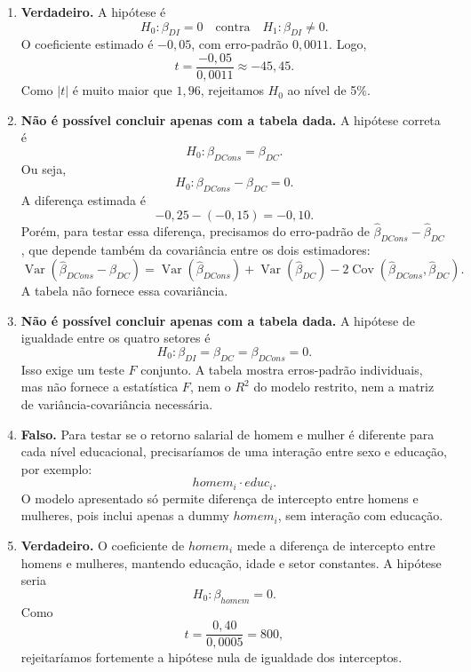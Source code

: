 \documentclass[12pt,letterpaper,onecolumn]{exam}
\begin{document}
\begin{questions}
\begin{enumerate}[label=(\arabic*)]
    \item \textbf{Verdadeiro.} A hipótese é
    \[
    H_0:\beta_{DI}=0
    \quad\text{contra}\quad
    H_1:\beta_{DI}\neq 0.
    \]
    O coeficiente estimado é \(-0{,}05\), com erro-padrão \(0{,}0011\). Logo,
    \[
    t=\frac{-0{,}05}{0{,}0011}\approx -45{,}45.
    \]
    Como \(|t|\) é muito maior que \(1{,}96\), rejeitamos \(H_0\) ao nível de 5\%.

    \item \textbf{Não é possível concluir apenas com a tabela dada.} A hipótese correta é
    \[
    H_0:\beta_{DCons}=\beta_{DC}.
    \]
    Ou seja,
    \[
    H_0:\beta_{DCons}-\beta_{DC}=0.
    \]
    A diferença estimada é
    \[
    -0{,}25-(-0{,}15)=-0{,}10.
    \]
    Porém, para testar essa diferença, precisamos do erro-padrão de \(\hat{\beta}_{DCons}-\hat{\beta}_{DC}\), que depende também da covariância entre os dois estimadores:
    \[
    \operatorname{Var}(\hat{\beta}_{DCons}-\hat{\beta}_{DC})
    =
    \operatorname{Var}(\hat{\beta}_{DCons})
    +
    \operatorname{Var}(\hat{\beta}_{DC})
    -
    2\operatorname{Cov}(\hat{\beta}_{DCons},\hat{\beta}_{DC}).
    \]
    A tabela não fornece essa covariância.

    \item \textbf{Não é possível concluir apenas com a tabela dada.} A hipótese de igualdade entre os quatro setores é
    \[
    H_0:\beta_{DI}=\beta_{DC}=\beta_{DCons}=0.
    \]
    Isso exige um teste \(F\) conjunto. A tabela mostra erros-padrão individuais, mas não fornece a estatística \(F\), nem o \(R^2\) do modelo restrito, nem a matriz de variância-covariância necessária.

    \item \textbf{Falso.} Para testar se o retorno salarial de homem e mulher é diferente para cada nível educacional, precisaríamos de uma interação entre sexo e educação, por exemplo:
    \[
    homem_i\cdot educ_i.
    \]
    O modelo apresentado só permite diferença de intercepto entre homens e mulheres, pois inclui apenas a dummy \(homem_i\), sem interação com educação.

    \item \textbf{Verdadeiro.} O coeficiente de \(homem_i\) mede a diferença de intercepto entre homens e mulheres, mantendo educação, idade e setor constantes. A hipótese seria
    \[
    H_0:\beta_{homem}=0.
    \]
    Como
    \[
    t=\frac{0{,}40}{0{,}0005}=800,
    \]
    rejeitaríamos fortemente a hipótese nula de igualdade dos interceptos.
\end{enumerate}


\end{questions}
\end{document}
